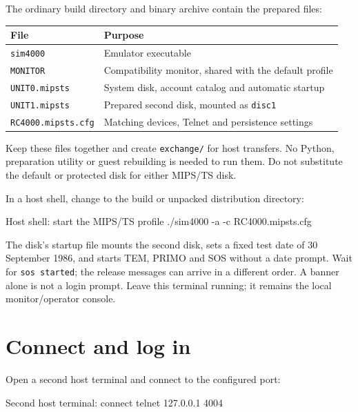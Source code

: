 The ordinary build directory and binary archive contain the prepared files:

\begin{center}
\begin{tabular}{@{}ll@{}}
\toprule
File & Purpose \\
\midrule
\texttt{sim4000} & Emulator executable \\
\texttt{MONITOR} & Compatibility monitor, shared with the default profile \\
\texttt{UNIT0.mipsts} & System disk, account catalog and automatic startup \\
\texttt{UNIT1.mipsts} & Prepared second disk, mounted as \texttt{disc1} \\
\texttt{RC4000.mipsts.cfg} & Matching devices, Telnet and persistence settings \\
\bottomrule
\end{tabular}
\end{center}

Keep these files together and create \texttt{exchange/} for host transfers.
No Python, preparation utility or guest rebuilding is needed to run them.
Do not substitute the default or protected disk for either MIPS/TS disk.

In a host shell, change to the build or unpacked distribution directory:

\begin{commandexample}[language=sh]{Host shell: start the MIPS/TS profile}
./sim4000 -a -c RC4000.mipsts.cfg
\end{commandexample}

The disk's startup file mounts the second disk, sets a fixed test date of
30 September 1986, and starts TEM, PRIMO and SOS without a date prompt.
Wait for \texttt{sos started}; the release messages can arrive in a different
order. A banner alone is not a login prompt. Leave this terminal running;
it remains the local monitor/operator console.

\section{Connect and log in}\label{mips-ts-login}

Open a second host terminal and connect to the configured port:

\begin{commandexample}[language=sh]{Second host terminal: connect}
telnet 127.0.0.1 4004
\end{commandexample}

